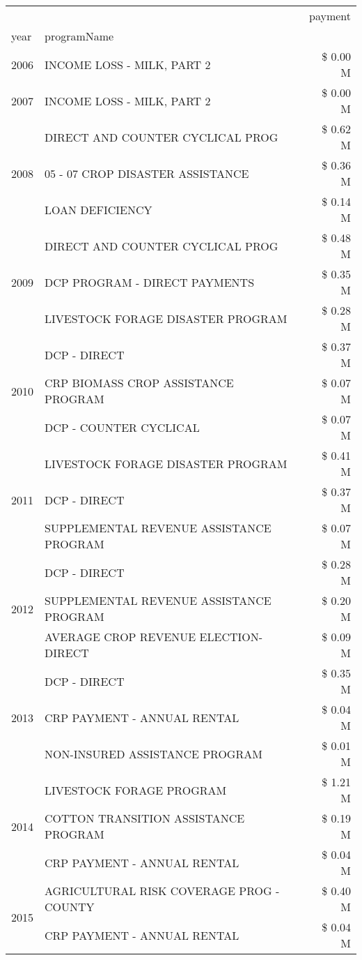 \begin{tabular}{llr}
\toprule
 &  & payment \\
year & programName &  \\
\midrule
2006 & INCOME LOSS - MILK, PART 2 & \$ 0.00 M \\
\cline{1-3}
2007 & INCOME LOSS - MILK, PART 2 & \$ 0.00 M \\
\cline{1-3}
\multirow[t]{3}{*}{2008} & DIRECT AND COUNTER CYCLICAL PROG & \$ 0.62 M \\
 & 05 - 07 CROP DISASTER ASSISTANCE & \$ 0.36 M \\
 & LOAN DEFICIENCY & \$ 0.14 M \\
\cline{1-3}
\multirow[t]{3}{*}{2009} & DIRECT AND COUNTER CYCLICAL PROG & \$ 0.48 M \\
 & DCP PROGRAM - DIRECT PAYMENTS & \$ 0.35 M \\
 & LIVESTOCK FORAGE DISASTER  PROGRAM & \$ 0.28 M \\
\cline{1-3}
\multirow[t]{3}{*}{2010} & DCP - DIRECT & \$ 0.37 M \\
 & CRP BIOMASS CROP ASSISTANCE PROGRAM & \$ 0.07 M \\
 & DCP - COUNTER CYCLICAL & \$ 0.07 M \\
\cline{1-3}
\multirow[t]{3}{*}{2011} & LIVESTOCK FORAGE DISASTER PROGRAM & \$ 0.41 M \\
 & DCP - DIRECT & \$ 0.37 M \\
 & SUPPLEMENTAL REVENUE ASSISTANCE PROGRAM & \$ 0.07 M \\
\cline{1-3}
\multirow[t]{3}{*}{2012} & DCP - DIRECT & \$ 0.28 M \\
 & SUPPLEMENTAL REVENUE ASSISTANCE PROGRAM & \$ 0.20 M \\
 & AVERAGE CROP REVENUE ELECTION-DIRECT & \$ 0.09 M \\
\cline{1-3}
\multirow[t]{3}{*}{2013} & DCP - DIRECT & \$ 0.35 M \\
 & CRP PAYMENT - ANNUAL RENTAL & \$ 0.04 M \\
 & NON-INSURED ASSISTANCE PROGRAM & \$ 0.01 M \\
\cline{1-3}
\multirow[t]{3}{*}{2014} & LIVESTOCK FORAGE PROGRAM & \$ 1.21 M \\
 & COTTON TRANSITION ASSISTANCE PROGRAM & \$ 0.19 M \\
 & CRP PAYMENT - ANNUAL RENTAL & \$ 0.04 M \\
\cline{1-3}
\multirow[t]{3}{*}{2015} & AGRICULTURAL RISK COVERAGE PROG - COUNTY & \$ 0.40 M \\
 & CRP PAYMENT - ANNUAL RENTAL & \$ 0.04 M \\

\end{tabular}
